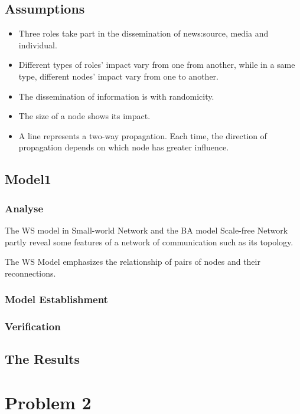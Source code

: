 \subsection{Assumptions}
\begin{itemize}
	\item Three roles take part in the dissemination of news:source, media and individual.
	\item Different types of roles' impact vary from one from another, while in a same type, different nodes' impact vary from one to another.
	\item The dissemination of information is with randomicity.
	\item The size of a node shows its impact.
	\item A line represents a two-way propagation. Each time, the direction of propagation depends on which node has greater influence.
\end{itemize}

\subsection{Model1}
\subsubsection*{Analyse}
\par The WS model in Small-world Network and the BA model Scale-free Network partly reveal some features of a network of communication such as its topology.
\par The WS Model emphasizes the relationship of pairs of nodes and their reconnections. 

\subsubsection*{Model Establishment}
\subsubsection*{Verification}
\subsection{The Results}

\section{Problem 2} 
